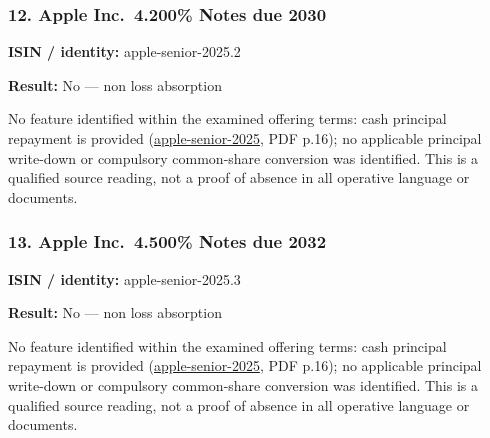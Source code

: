 \documentclass[
  11pt,
]{article}
\begin{document}
\begin{minipage}{\linewidth}

\hypertarget{apple-inc.-4.200-notes-due-2030}{%
\subsubsection{12. Apple Inc.~4.200\% Notes due
2030}\label{apple-inc.-4.200-notes-due-2030}}

\textbf{ISIN / identity:} apple-senior-2025.2

\textbf{Result:} No --- non loss absorption

No feature identified within the examined offering terms: cash principal
repayment is provided
(\href{https://d18rn0p25nwr6d.cloudfront.net/CIK-0000320193/d9065b65-eeb8-439b-97fc-be1d38ce0d2e.pdf}{apple-senior-2025},
PDF p.16); no applicable principal write-down or compulsory common-share
conversion was identified. This is a qualified source reading, not a
proof of absence in all operative language or documents.

\end{minipage}
\par\addvspace{1.1em}

\begin{minipage}{\linewidth}

\hypertarget{apple-inc.-4.500-notes-due-2032}{%
\subsubsection{13. Apple Inc.~4.500\% Notes due
2032}\label{apple-inc.-4.500-notes-due-2032}}

\textbf{ISIN / identity:} apple-senior-2025.3

\textbf{Result:} No --- non loss absorption

No feature identified within the examined offering terms: cash principal
repayment is provided
(\href{https://d18rn0p25nwr6d.cloudfront.net/CIK-0000320193/d9065b65-eeb8-439b-97fc-be1d38ce0d2e.pdf}{apple-senior-2025},
PDF p.16); no applicable principal write-down or compulsory common-share
conversion was identified. This is a qualified source reading, not a
proof of absence in all operative language or documents.

\end{minipage}
\par\addvspace{1.1em}
\end{document}

